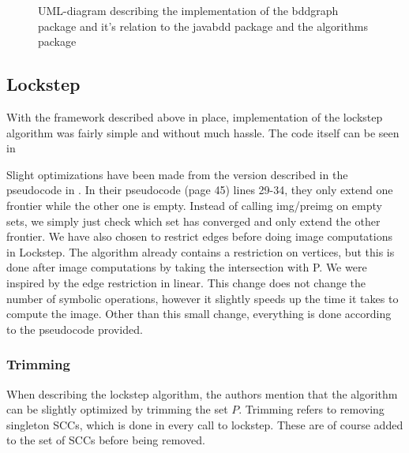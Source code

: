 \documentclass[../master/master.tex]{subfiles}
\begin{document}
\begin{figure}[H]
\begin{center}
\end{center}
\caption{UML-diagram describing the implementation of the bddgraph package and it's relation to the javabdd package and the algorithms package}
\label{main_uml}
\end{figure}

\subsection{Lockstep}
With the framework described above in place, implementation of the lockstep algorithm was fairly simple and without much hassle. The code itself can be seen in 

Slight optimizations have been made from the version described in the pseudocode in \cite{lockstep}. In their pseudocode (page 45) lines 29-34, they only extend one frontier while the other one is empty. Instead of calling img/preimg on empty sets, we simply just check which set has converged and only extend the other frontier. We have also chosen to restrict edges before doing image computations in Lockstep. The algorithm already contains a restriction on vertices, but this is done after image computations by taking the intersection with P. We were inspired by the edge restriction in linear. This change does not change the number of symbolic operations, however it slightly speeds up the time it takes to compute the image.
Other than this small change, everything is done according to the pseudocode provided. 

\subsubsection{Trimming}
When describing the lockstep algorithm\cite{lockstep}, the authors mention that the algorithm can be slightly optimized by trimming the set $P$. Trimming refers to removing singleton SCCs, which is done in every call to lockstep. These are of course added to the set of SCCs before being removed.
\end{document}
